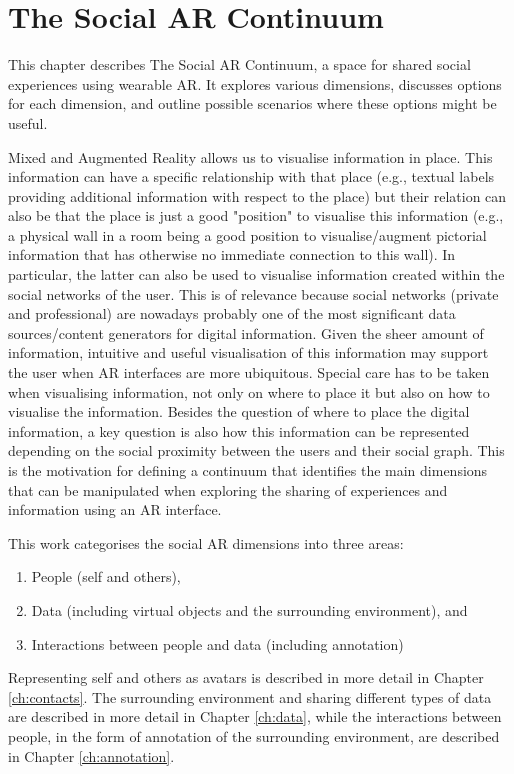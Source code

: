 \chapter{The Social AR Continuum}
\label{ch:continuum}

This chapter describes The Social AR Continuum, a space for shared social experiences using wearable AR. It explores various dimensions, discusses options for each dimension, and outline possible scenarios where these options might be useful.

Mixed and Augmented Reality allows us to visualise information in place. This information can have a specific relationship with that place (e.g., textual labels providing additional information with respect to the place) but their relation can also be that the place is just a good "position" to visualise this information (e.g., a physical wall in a room being a good position to visualise/augment pictorial information that has otherwise no immediate connection to this wall). In particular, the latter can also be used to visualise information created within the social networks of the user. This is of relevance because social networks (private and professional) are nowadays probably one of the most significant data sources/content generators for digital information. Given the sheer amount of information, intuitive and useful visualisation of this information may support the user when AR interfaces are more ubiquitous. Special care has to be taken when visualising information, not only on where to place it but also on how to visualise the information. Besides the question of where to place the digital information, a key question is also how this information can be represented depending on the social proximity between the users and their social graph. This is the motivation for defining a continuum that identifies the main dimensions that can be manipulated when exploring the sharing of experiences and information using an AR interface. 

This work categorises the social AR dimensions into three areas: 
\begin{enumerate}
    \item People (self and others),
    \item Data (including virtual objects and the surrounding environment), and
    \item Interactions between people and data (including annotation)
\end{enumerate}

Representing self and others as avatars is described in more detail in Chapter \ref{ch:contacts}. The surrounding environment and sharing different types of data are described in more detail in Chapter \ref{ch:data}, while the interactions between people, in the form of annotation of the surrounding environment, are described in Chapter \ref{ch:annotation}.

